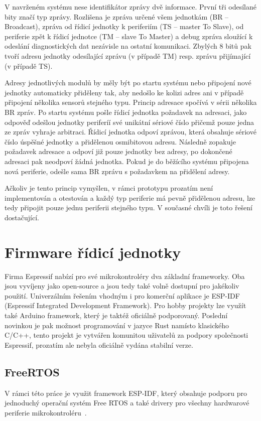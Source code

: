     V navrženém systému nese identifikátor zprávy dvě informace. První tři odesílané bity značí typ zprávy. Rozlišena je zpráva určené všem jednotkám (BR -- Broadcast), zpráva od řídicí jednotky k periferiím (TS -- master To Slave), od periferie zpět k řídicí jednotce (TM -- slave To Master) a debug zpráva sloužící k odeslání diagnostických dat nezávisle na ostatní komunikaci. Zbylých 8 bitů pak tvoří adresu jednotky odesílající zprávu (v případě TM) resp. zprávu přijímající (v případě TS). 
    
    Adresy jednotlivých modulů by měly být po startu systému nebo připojení nové jednotky automaticky přiděleny tak, aby nedošlo ke kolizi adres ani v případě připojení několika sensorů stejného typu. Princip adresace spočívá v sérii několika BR zpráv. Po startu systému pošle řídicí jednotka požadavek na adresaci, jako odpověď odešlou jednotky periferíí své unikátní sériové číslo přičemž pouze jedna ze zpráv vyhraje arbitraci. Řídicí jednotka odpoví zprávou, která obsahuje sériové číslo úspěšné jednotky a přidělenou osmibitovou adresu. Následně zopakuje požadavek adresace a odpoví již pouze jednotky bez adresy, po dokončené adresaci pak neodpoví žádná jednotka. Pokud je do běžícího systému připojena nová periferie, odešle sama BR zprávu s požadavkem na přidělení adresy.

    Ačkoliv je tento princip vymyšlen, v rámci prototypu prozatím není implementován a otestován a každý typ periferie má pevně přidělenou adresu, lze tedy připojit pouze jednu periferii stejného typu. V současné chvíli je toto řešení dostačující.



\section{Firmware řídicí jednotky}
    Firma Espressif nabízí pro své mikrokontroléry dva základní frameworky. Oba jsou vyvíjeny jako open-source a jsou tedy také volně dostupní pro jakékoliv použití. Univerzálním řešením vhodným i pro komerční aplikace je ESP-IDF (Espressif Integrated Development Framework). Pro hobby projekty lze využít také Arduino framework, který je taktéž oficiálně podporovaný. Poslední novinkou je pak možnost programování v jazyce Rust namísto klasického C/C++, tento projekt je vytvářen komunitou uživatelů za podpory společnosti Espressif, prozatím ale nebyla oficiálně vydána stabilní verze. 

    \subsection{FreeRTOS}
        V rámci této práce je využit framework ESP-IDF, který obsahuje podporu pro jednoduchý operační systém Free RTOS a také drivery pro všechny hardwarové periferie mikrokontroléru~\cite{espressif-idf}.

